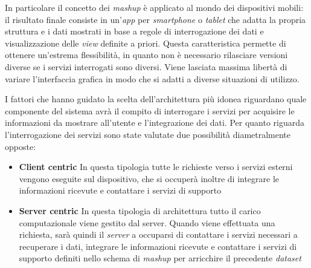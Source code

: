 In particolare il concetto dei \emph{mashup} è applicato al mondo dei dispositivi mobili: il risultato finale consiste in un'\emph{app} per \emph{smartphone} o \emph{tablet} che adatta la propria struttura e i dati mostrati in base a regole di interrogazione dei dati e visualizzazione delle \emph{view} definite a priori. Questa caratteristica permette di ottenere un'estrema flessibilità, in quanto non è necessario rilasciare versioni diverse se i servizi interrogati sono diversi. Viene lasciata massima libertà di variare l'interfaccia grafica in modo che si adatti a diverse situazioni di utilizzo.

I fattori che hanno guidato la scelta dell'architettura più idonea riguardano quale componente del sistema avrà il compito di interrogare i servizi per acquisire le informazioni da mostrare all'utente e l'integrazione dei dati.
Per quanto riguarda l'interrogazione dei servizi sono state valutate due possibilità diametralmente opposte:

\begin{itemize}
	\item \textbf{Client centric}
	In questa tipologia tutte le richieste verso i servizi esterni vengono eseguite sul dispositivo, che si occuperà inoltre di integrare le informazioni ricevute e contattare i servizi di supporto
	\item \textbf{Server centric}
	In questa tipologia di architettura tutto il carico computazionale viene gestito dal server. Quando viene effettuata una richiesta, sarà quindi il \emph{server} a occuparsi di contattare i servizi necessari a recuperare i dati, integrare le informazioni ricevute e contattare i servizi di supporto definiti nello schema di \emph{mashup} per arricchire il precedente \emph{dataset}
\end{itemize}

